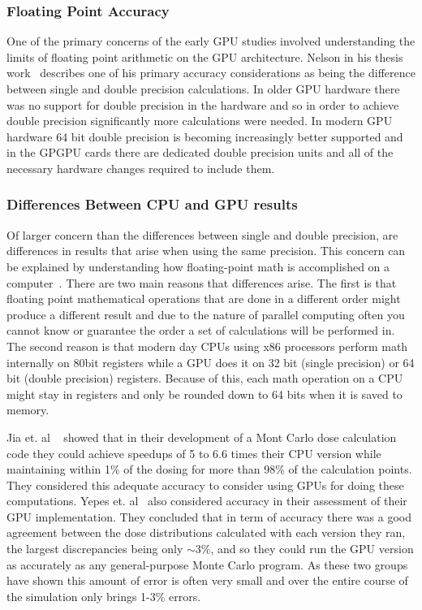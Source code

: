 \subsubsection*{\textbf{Floating Point Accuracy}}

One of the primary concerns of the early GPU studies involved understanding the limits of floating point arithmetic on the GPU architecture.
%
Nelson in his thesis work~\cite{nelson2009monte} describes one of his primary accuracy considerations as being the difference between single and double precision calculations.
%
In older GPU hardware there was no support for double precision in the hardware and so in order to achieve double precision significantly more calculations were needed.
%
In modern GPU hardware 64 bit double precision is becoming increasingly better supported and in the GPGPU cards there are dedicated double precision units and all of the necessary hardware changes required to include them.
%

\subsubsection*{\textbf{Differences Between CPU and GPU results}}

Of larger concern than the differences between single and double precision, are differences in results that arise when using the same precision.
%
This concern can be explained by understanding how floating-point math is accomplished on a computer~\cite{goldberg1991every}.
%
There are two main reasons that differences arise.
%
The first is that floating point mathematical operations that are done in a different order might produce a different result and due to the nature of parallel computing often you cannot know or guarantee the order a set of calculations will be performed in.
%
The second reason is that modern day CPUs using x86 processors perform math internally on 80bit registers while a GPU does it on 32 bit (single precision) or 64 bit (double precision) registers.
%
Because of this, each math operation on a CPU might stay in registers and only be rounded down to 64 bits when it is saved to memory.
%

%
Jia et. al ~\cite{jia2010development} showed that in their development of a Mont Carlo dose calculation code they could achieve speedups of 5 to 6.6 times their CPU version while maintaining within 1\% of the dosing for more than 98\% of the calculation points.
%
They considered this adequate accuracy to consider using GPUs for doing these computations.
%
Yepes et. al~\cite{yepes2010gpu} also considered accuracy in their assessment of their GPU implementation.
%
They concluded that in term of accuracy there was a good agreement between the dose distributions calculated with each version they ran, the largest discrepancies being only $\sim$3\%, and so they could run the GPU version as accurately as any general-purpose Monte Carlo program.
%
As these two groups have shown this amount of error is often very small and over the entire course of the simulation only brings 1-3\% errors.

